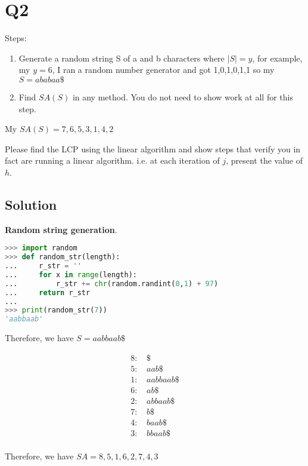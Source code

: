 
\section*{Q2}

Steps:
\begin{enumerate}
    \item Generate a random string S of a and b characters where $|S|=y$, for example, my $y=6$, I ran a random number generator and got 1,0,1,0,1,1 so my $S=ababaa\$$
    \item Find $SA(S)$ in any method. You do not need to show work at all for this step.
\end{enumerate}

My $SA(S)=7,6,5,3,1,4,2$

Please find the LCP using the linear algorithm and show steps that verify you in fact are running a linear algorithm. i.e. at each iteration of $j$, present the value of $h$.

\subsection*{Solution}

\textbf{Random string generation}.
\begin{lstlisting}[language=python]
>>> import random
>>> def random_str(length):
...     r_str = ''
...     for x in range(length):
...         r_str += chr(random.randint(0,1) + 97)
...     return r_str
...
>>> print(random_str(7))
'aabbaab'
\end{lstlisting}

Therefore, we have $S = aabbaab\$$

\begin{align*}
    8 \text{: } & \$        \\
    5 \text{: } & aab\$     \\
    1 \text{: } & aabbaab\$ \\
    6 \text{: } & ab\$      \\
    2 \text{: } & abbaab\$  \\
    7 \text{: } & b\$       \\
    4 \text{: } & baab\$    \\
    3 \text{: } & bbaab\$   \\
\end{align*}

Therefore, we have $SA = 8, 5, 1, 6, 2, 7, 4, 3$

